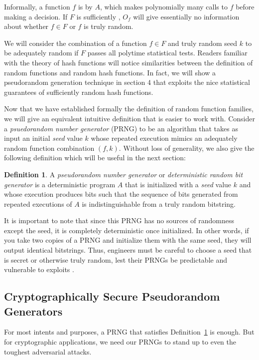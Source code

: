 \documentclass[titlepage]{article}
\theoremstyle{definition}
\newtheorem{definition}{Definition}[section]
\begin{document}
Informally, a function $f$ is  by $A$, which makes polynomially many calls to $f$ before making a decision. If $F$ is sufficiently , $O_f$ will give essentially no information about whether $f \in F$ or $f$ is truly random.

We will consider the combination of a function $f \in F$ and truly random seed $k$ to be adequately random if $F$ passes all polytime statistical tests. Readers familiar with the theory of hash functions will notice similarities between the definition of random functions and random hash functions. In fact, we will show a pseudorandom generation technique in section 4 that exploits the nice statistical guarantees of sufficiently random hash functions.

Now that we have established formally the definition of random function families, we will give an equivalent intuitive definition that is easier to work with. Consider a \textit{psuedorandom number generator} (PRNG) to be an algorithm that takes as input an initial \textit{seed} value $k$ whose repeated execution mimics an adequately random function combination $(f,k)$. Without loss of generality, we also give the following definition which will be useful in the next section:

\begin{definition}\label{def:PRNG}
A \textit{pseudorandom number generator} or \textit{deterministic random bit generator} is a deterministic program $A$ that is initialized with a \textit{seed} value $k$ and whose execution produces bits such that the sequence of bits generated from repeated executions of $A$ is indistinguishable from a truly random bitstring. \cite{PractCrypt}
\end{definition}

It is important to note that since this PRNG has no sources of randomness except the seed, it is completely deterministic once initialized. In other words, if you take two copies of a PRNG and initialize them with the same seed, they will output identical bitstrings. Thus, engineers must be careful to choose a seed that is secret or otherwise truly random, lest their PRNGs be predictable and vulnerable to exploits \cite{NIST}.

\subsection{Cryptographically Secure Pseudorandom Generators}
For most intents and purposes, a PRNG that satisfies Definition~\ref{def:PRNG} is enough. But for cryptographic applications, we need our PRNGs to stand up to even the toughest adversarial attacks.
\end{document}

